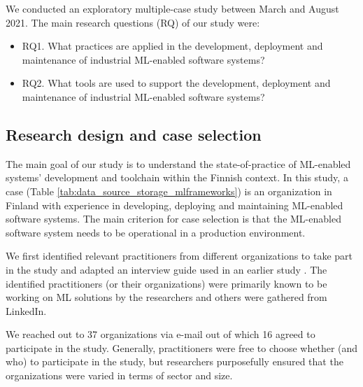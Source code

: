 %

We conducted an exploratory multiple-case study \cite{Runeson2008} between March and August 2021. 
The main research questions (RQ) of our study were:
\begin{itemize}
    \item RQ1. What practices are applied in the development, deployment and maintenance of industrial ML-enabled software systems?
    \item RQ2. What tools are used to support the development, deployment and maintenance of industrial ML-enabled software systems?
\end{itemize}

\subsection{Research design and case selection}
The main goal of our study is to understand the state-of-practice of ML-enabled systems' development and toolchain within the Finnish context. In this study, a case (Table \ref{tab:data_source_storage_mlframeworks}) is an organization in Finland with experience in developing, deploying and maintaining ML-enabled software systems. The main criterion for case selection is that the ML-enabled software system needs to be operational in a production environment. %

We first identified relevant practitioners from different organizations to take part in the study and adapted an interview guide used in an earlier study \cite{Lwakatare2019}. The identified practitioners (or their organizations) were primarily known to be working on ML solutions by the researchers and others were gathered from LinkedIn. %

We reached out to 37 organizations via e-mail out of which 16 agreed to participate in the study. %
Generally, practitioners were free to choose whether (and who) to participate in the study, but researchers purposefully ensured that the organizations were varied in terms of sector and size. 

